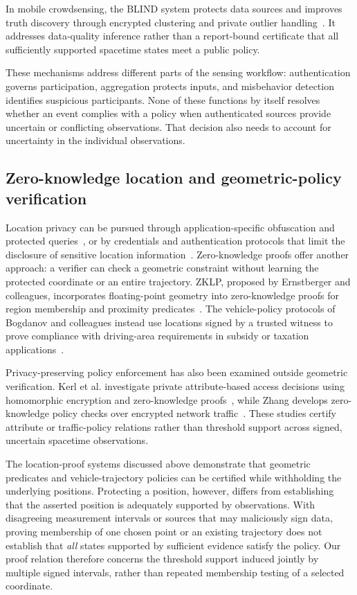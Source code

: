 In mobile crowdsensing, the BLIND system protects data sources and improves truth discovery through encrypted clustering and private outlier handling~\citep{JNCaAgate2024}. It addresses data-quality inference rather than a report-bound certificate that all sufficiently supported spacetime states meet a public policy.

These mechanisms address different parts of the sensing workflow: authentication governs participation, aggregation protects inputs, and misbehavior detection identifies suspicious participants. None of these functions by itself resolves whether an event complies with a policy when authenticated sources provide uncertain or conflicting observations. That decision also needs to account for uncertainty in the individual observations.

\subsection{Zero-knowledge location and geometric-policy verification}
Location privacy can be pursued through application-specific obfuscation and protected queries~\citep{Mdee2022,Atmaca2024}, or by credentials and authentication protocols that limit the disclosure of sensitive location information~\citep{Ghani2025,Zhang2025Sybil,Wang2025ZKAuth}. Zero-knowledge proofs offer another approach: a verifier can check a geometric constraint without learning the protected coordinate or an entire trajectory. ZKLP, proposed by Ernstberger and colleagues, incorporates floating-point geometry into zero-knowledge proofs for region membership and proximity predicates~\citep{ZKLP}. The vehicle-policy protocols of Bogdanov and colleagues instead use locations signed by a trusted witness to prove compliance with driving-area requirements in subsidy or taxation applications~\citep{VehiclePolicy}.

Privacy-preserving policy enforcement has also been examined outside geometric verification. Kerl et al. investigate private attribute-based access decisions using homomorphic encryption and zero-knowledge proofs~\citep{CybersecKerl2025}, while Zhang develops zero-knowledge policy checks over encrypted network traffic~\citep{CybersecZhang2026}. These studies certify attribute or traffic-policy relations rather than threshold support across signed, uncertain spacetime observations.

The location-proof systems discussed above demonstrate that geometric predicates and vehicle-trajectory policies can be certified while withholding the underlying positions. Protecting a position, however, differs from establishing that the asserted position is adequately supported by observations. With disagreeing measurement intervals or sources that may maliciously sign data, proving membership of one chosen point or an existing trajectory does not establish that \emph{all} states supported by sufficient evidence satisfy the policy. Our proof relation therefore concerns the threshold support induced jointly by multiple signed intervals, rather than repeated membership testing of a selected coordinate.

